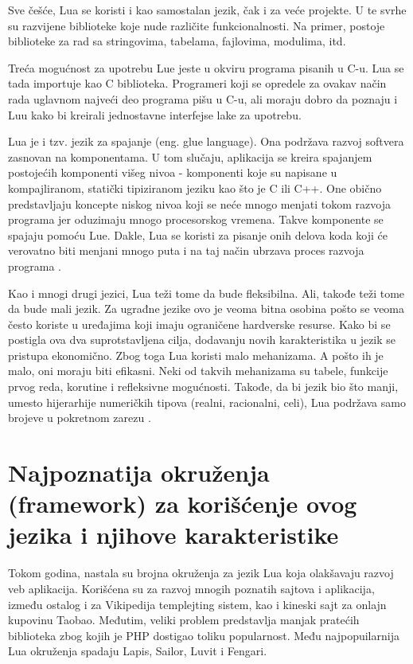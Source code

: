 \documentclass[a4paper]{article}
\begin{document}
Sve češće, Lua se koristi i kao samostalan jezik, čak i za veće projekte. U te svrhe su razvijene biblioteke koje nude različite funkcionalnosti. Na primer, postoje biblioteke za rad sa stringovima, tabelama, fajlovima, modulima, itd.

Treća mogućnost za upotrebu Lue jeste u okviru programa pisanih u C-u. Lua se tada importuje kao C biblioteka. Programeri koji se opredele za ovakav način rada uglavnom najveći deo programa pišu u C-u, ali moraju dobro da poznaju i Luu kako bi kreirali jednostavne interfejse lake za upotrebu.

Lua je i tzv. jezik za spajanje (eng. glue language). Ona podržava razvoj softvera zasnovan na komponentama. U tom slučaju, aplikacija se kreira spajanjem postojećih komponenti višeg nivoa - komponenti koje su napisane u kompajliranom, statički tipiziranom jeziku kao što je C ili C++. One obično predstavljaju koncepte niskog nivoa koji se neće mnogo menjati tokom razvoja programa jer oduzimaju mnogo procesorskog vremena. Takve komponente se spajaju pomoću Lue. Dakle, Lua se koristi za pisanje onih delova koda koji će verovatno biti menjani mnogo puta i na taj način ubrzava proces razvoja programa \cite{bookProgInLua}.

Kao i mnogi drugi jezici, Lua teži tome da bude fleksibilna. Ali, takođe teži tome da bude mali jezik. Za ugrađne jezike ovo je veoma bitna osobina pošto se veoma često koriste u uređajima koji imaju ograničene hardverske resurse. Kako bi se postigla ova dva suprotstavljena cilja, dodavanju novih karakteristika u jezik se pristupa ekonomično. Zbog toga Lua koristi malo mehanizama. A pošto ih je malo, oni moraju biti efikasni. Neki od takvih mehanizama su tabele, funkcije prvog reda, korutine i refleksivne mogućnosti. Takođe, da bi jezik bio što manji, umesto hijerarhije numeričkih tipova (realni, racionalni, celi), Lua podržava samo brojeve u pokretnom zarezu \cite{multiParadigms}.

\section{Najpoznatija okruženja (framework) za korišćenje ovog jezika i njihove karakteristike}
\label{sec:framework}

Tokom godina, nastala su brojna okruženja za jezik Lua koja olakšavaju razvoj veb aplikacija. Korišćena su za razvoj mnogih poznatih sajtova i aplikacija, između ostalog i za Vikipedija templejting sistem, kao i kineski sajt za onlajn kupovinu Taobao. Međutim, veliki problem predstavlja manjak pratećih biblioteka zbog kojih je PHP dostigao toliku popularnost. 
Među najpopuilarnija Lua okruženja spadaju Lapis, Sailor, Luvit i Fengari. 
\end{document}
